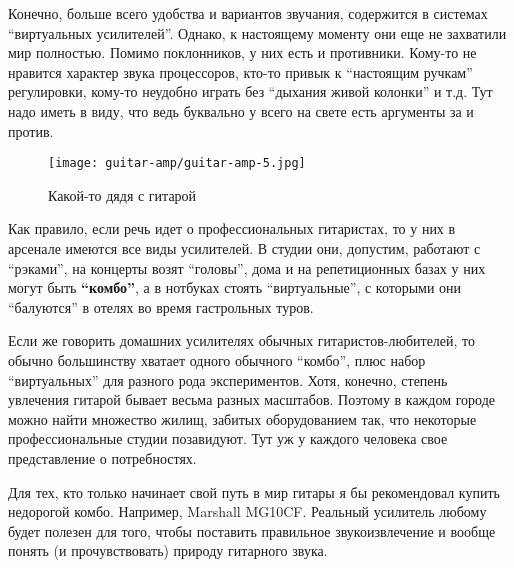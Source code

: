Конечно, больше всего удобства и вариантов звучания, содержится в системах “виртуальных усилителей”. Однако, к настоящему моменту они еще не захватили мир полностью. Помимо поклонников, у них есть и противники. Кому-то не нравится характер звука процессоров, кто-то привык к “настоящим ручкам” регулировки, кому-то неудобно играть без “дыхания живой колонки” и т.д. Тут надо иметь в виду, что ведь буквально у всего на свете есть аргументы за и против.
\begin{figure}[h]
\centering
\texttt{[image: guitar-amp/guitar-amp-5.jpg]}

\caption{Какой-то дядя с гитарой}
\label{guitar-amp:man-with-guitar}
\end{figure}

Как правило, если речь идет о профессиональных гитаристах, то у них в арсенале имеются все виды усилителей. В студии они, допустим, работают с “рэками”, на концерты возят “головы”, дома и на репетиционных базах у них могут быть \textbf{“комбо”}, а в нотбуках стоять “виртуальные”, с которыми они “балуются” в отелях во время гастрольных туров.

Если же говорить домашних усилителях обычных гитаристов-любителей, то обычно большинству хватает одного обычного “комбо”, плюс набор “виртуальных” для разного рода экспериментов. Хотя, конечно, степень увлечения гитарой бывает весьма разных масштабов. Поэтому в каждом городе можно найти множество жилищ, забитых оборудованием так, что некоторые профессиональные студии позавидуют. Тут уж у каждого человека свое представление о потребностях.

Для тех, кто только начинает свой путь в мир гитары я бы рекомендовал купить недорогой комбо. Например, Marshall MG10CF. Реальный усилитель любому будет полезен для того, чтобы поставить правильное звукоизвлечение и вообще понять (и прочувствовать) природу гитарного звука.